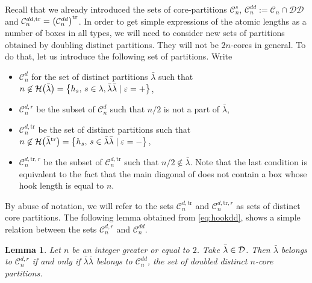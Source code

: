 \documentclass[10pt,a4paper]{amsart}
\newtheorem{Lemma}[Theorem]{Lemma}
\numberwithin{equation}{section}
\newcommand{\cC}{\mathcal{C}}
\def\cch{\mathcal H}
\def\ccdd{\mathcal {DD}}
\def\ccd{\mathcal {D}}
\begin{document}
Recall that we already introduced the sets of core-partitions $\cC_{n}^{s}$,
$\cC_{n}^{dd}:=\cC_{n}\cap \ccdd$ and $\smash{\cC_{n}^{dd,\mathrm{tr}}}=\smash{\bigl(\cC_{n}^{dd}\bigr) ^{\mathrm{tr}}}$.
In order to get simple expressions of the
atomic lengths as a number of boxes in all types, we will need to consider
new sets of partitions obtained by doubling distinct partitions. They will
not be $2n$-cores in general. To do that, let us introduce the following set
of partitions. Write
\begin{itemize}\itemsep=0pt
	\item $\cC_{n}^{d}$ for the set of distinct partitions $\bar{\lambda}$ such
	that $n\not\in \cch\bigl(\bar{\lambda}\bigr)=\bigl\{h_{s},\, s\in \lambda ,\bar{\lambda}\bar{%
		\lambda}\mid \varepsilon =+\bigr\}$,
	
	\item $\cC_{n}^{d,r}$ be the subset of $\cC_{n}^{d}$ such that $n/2$ is not
	a part of $\bar{\lambda}$,
	
	\item $\cC_{n}^{d,\mathrm{tr}}$ be the set of distinct partitions such that $%
	n\not\in \cch\bigl(\bar{\lambda}^{\mathrm{tr}}\bigr)=\bigl\{h_{s},\, s\in \bar{\lambda}\bar{%
		\lambda}\mid \varepsilon =-\bigr\}$,
	
	\item $\cC_{n}^{d,\mathrm{tr},r}$ be the subset of $\cC_{n}^{d,\mathrm{tr}}$
	such that $n/2\not\in \bar{\lambda}$. Note that the last condition is equivalent to the fact that the main diagonal of  does not contain a box whose hook length is equal to $n$.
\end{itemize}

By abuse of notation, we will refer to the sets $\cC_{n}^{d,\mathrm{tr}}$
and $\cC_{n}^{d,\mathrm{tr},r}$ as sets of distinct core partitions.
The following lemma obtained from \eqref{eq:hookdd}, shows a simple relation between the sets $%
\cC_{n}^{d,r}$ and $\cC_{n}^{dd}$.

\begin{Lemma}
	\label{lem:dd} Let $n$ be an integer greater or equal to $2$. Take $\bar{%
		\lambda}\in\ccd$. Then $\bar{\lambda}$ belongs to $\cC_{n}^{d,r}$ if and
	only if $\bar{\lambda}\bar{\lambda}$ belongs to $\cC_{n}^{dd}$, the set of
	doubled distinct $n$-core partitions.
\end{Lemma}
\end{document}
